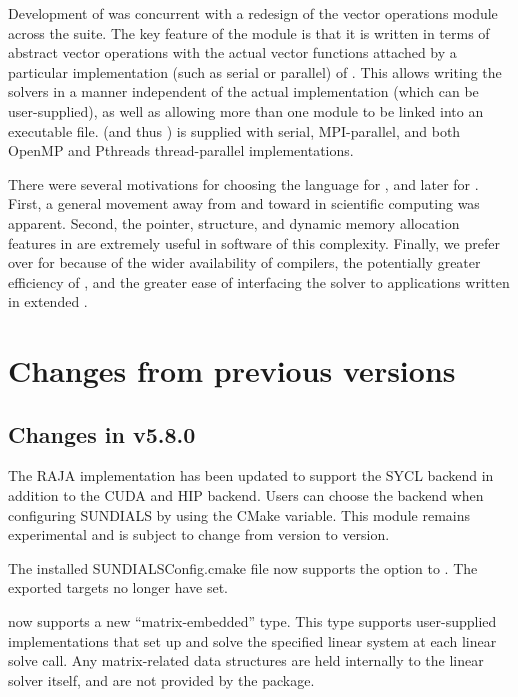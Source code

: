 Development of {\cvodes} was concurrent with a redesign of the vector
operations module across the {\sundials} suite. The key feature of the
{\nvector} module is that it is written in terms of abstract
vector operations with the actual vector functions attached by a
particular implementation (such as serial or parallel) of
{\nvector}. This allows writing the {\sundials} solvers in a manner
independent of the actual {\nvector} implementation (which can be
user-supplied), as well as allowing more than one {\nvector} module to
be linked into an executable file.
{\sundials} (and thus {\cvodes}) is supplied with serial,
MPI-parallel, and both OpenMP and Pthreads thread-parallel
{\nvector} implementations.

 There were
several motivations for choosing the {\CC} language for {\cvode}, and
later for {\cvodes}.  First, a general movement away from {\F} and
toward {\CC} in scientific computing was apparent.
Second, the pointer, structure, and dynamic memory allocation features
in {\CC} are extremely useful in software of this complexity.  Finally,
we prefer {\CC} over {\CPP} for {\cvodes} because of the wider
availability of {\CC} compilers, the potentially greater efficiency of
{\CC}, and the greater ease of interfacing the solver to applications
written in extended {\F}.  

\section{Changes from previous versions}

\subsection*{Changes in v5.8.0}

The RAJA {\nvector} implementation has been updated to support the SYCL backend
in addition to the CUDA and HIP backend. Users can choose the backend when
configuring SUNDIALS by using the  CMake variable.
This module remains experimental and is subject to change from version to
version.

The installed SUNDIALSConfig.cmake file now supports the  option
to . The exported targets no longer have  set.

{\cvodes} now supports a new ``matrix-embedded'' {\sunlinsol} type.  This type
supports user-supplied {\sunlinsol} implementations that set up and solve the
specified linear system at each linear solve call.  Any matrix-related data
structures are held internally to the linear solver itself, and are not
provided by the {\sundials} package.

